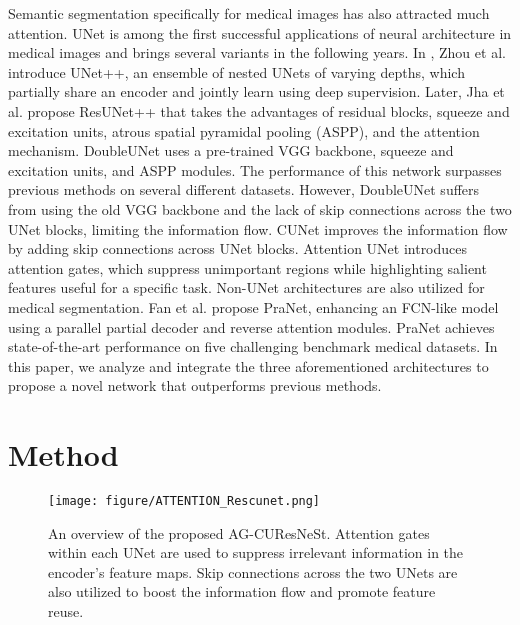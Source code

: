 \documentclass[review, sort&compress]{elsarticle}
\begin{document}
	Semantic segmentation specifically for medical images has also attracted much attention. UNet is among the first successful applications of neural architecture in medical images and brings several variants in the following years. In \cite{zhou2019unet++}, Zhou et al. introduce UNet++, an ensemble of nested UNets of varying depths, which partially share an encoder and jointly learn using deep supervision. Later, Jha et al. \cite{jha2019resunet++} propose ResUNet++ that takes the advantages of residual blocks, squeeze and excitation units, atrous spatial pyramidal pooling (ASPP), and the attention mechanism. 
	DoubleUNet \cite{jha2020doubleu} uses a pre-trained VGG backbone, squeeze and excitation units, and ASPP modules. The performance of this network surpasses previous methods on several different datasets. However,  DoubleUNet suffers from using the old VGG backbone and the lack of skip connections across the two UNet blocks, limiting the information flow. CUNet \cite{tang2019cu} improves the information flow by adding skip connections across UNet blocks. Attention UNet \cite{oktay2018attention} introduces attention gates, which suppress unimportant regions while highlighting salient features useful for a specific task. 	
	Non-UNet architectures are also utilized for medical segmentation. Fan et al. \cite{fan2020pranet} propose PraNet, enhancing an FCN-like model using a parallel partial decoder and reverse attention modules. PraNet achieves state-of-the-art performance on five challenging benchmark medical datasets.
	In this paper, we analyze and integrate the three aforementioned architectures  \cite{tang2019cu,jha2020doubleu,oktay2018attention} to propose a novel network that outperforms previous methods.
	


	\section{Method}
	\label{sec:propose}
	\begin{figure*}[ht!]
		\texttt{[image: figure/ATTENTION\_Rescunet.png]}
		\caption{An overview of the proposed AG-CUResNeSt. Attention gates within each UNet are used to suppress irrelevant information in the encoder's feature maps. Skip connections across the two UNets are also utilized to boost the information flow and promote feature reuse.}
		\label{fig:fig_attention_ResCUNeSt}
	\end{figure*}
	
\end{document}
